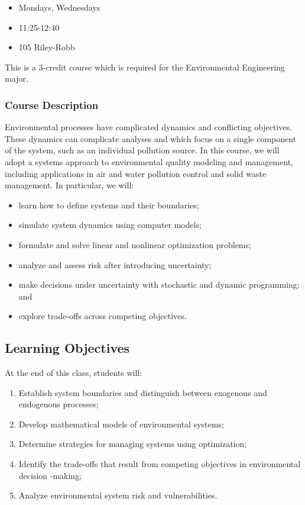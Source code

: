 \documentclass[
  letterpaper,
  DIV=11,
  numbers=noendperiod]{scrartcl}
\providecommand{\tightlist}{%
  \setlength{\itemsep}{0pt}\setlength{\parskip}{0pt}}\usepackage{longtable,booktabs,array}
\begin{document}
\begin{itemize}
\tightlist
\item
   Mondays, Wednesdays
\item
   11:25-12:40
\item
   {105 Riley-Robb}
\end{itemize}

This is a 3-credit course which is required for the Environmental
Engineering major.

\hypertarget{course-description}{%
\subsubsection{Course Description}\label{course-description}}

Environmental processes have complicated dynamics and conflicting
objectives. These dynamics can complicate analyses and which focus on a
single component of the system, such as an individual pollution source.
In this course, we will adopt a systems approach to environmental
quality modeling and management, including applications in air and water
pollution control and solid waste management. In particular, we will:

\begin{itemize}
\tightlist
\item
  learn how to define systems and their boundaries;
\item
  simulate system dynamics using computer models;
\item
  formulate and solve linear and nonlinear optimization problems;
\item
  analyze and assess risk after introducing uncertainty;
\item
  make decisions under uncertainty with stochastic and dynamic
  programming; and
\item
  explore trade-offs across competing objectives.
\end{itemize}

\hypertarget{learning-objectives}{%
\subsection{Learning Objectives}\label{learning-objectives}}

At the end of this class, students will:

\begin{enumerate}
\def\labelenumi{\arabic{enumi}.}
\tightlist
\item
  Establish system boundaries and distinguish between exogenous and
  endogenous processes;
\item
  Develop mathematical models of environmental systems;
\item
  Determine strategies for managing systems using optimization;
\item
  Identify the trade-offs that result from competing objectives in
  environmental decision -making;
\item
  Analyze environmental system risk and vulnerabilities.
\end{enumerate}
\end{document}

